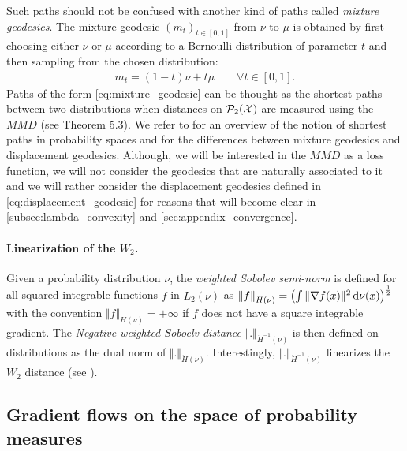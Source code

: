 \begin{remark}
	Such paths should not be confused with another kind of paths called \textit{mixture geodesics}. The mixture geodesic $(m_t)_{t\in[0,1]}$ from $\nu$ to $\mu$ is obtained by first choosing either $\nu$ or $\mu$ according to a Bernoulli distribution of parameter $t$ and then sampling from the chosen distribution:
	\begin{align}\label{eq:mixture_geodesic}
	m_t = (1-t)\nu + t\mu \qquad \forall t \in [0,1].
	\end{align}
	Paths of the form \cref{eq:mixture_geodesic} can be thought as the shortest paths between two distributions when distances on $\mathcal{P}_2({{\mathcal X}})$ are measured using the $MMD$ (see \cite{Bottou:2017} Theorem 5.3). We refer to \cite{Bottou:2017} for an overview of the notion of shortest paths in probability spaces and for the differences between mixture geodesics and displacement geodesics.
	Although, we will be interested in the $MMD$ as a loss function, we will not consider the geodesics that are naturally associated to it and we will rather consider the displacement geodesics defined in \cref{eq:displacement_geodesic} for reasons that will become clear in \cref{subsec:lambda_convexity} and \cref{sec:appendix_convergence}.
\end{remark}


\paragraph{Linearization of the $W_2$.} Given a probability distribution $\nu$, the \textit{weighted Sobolev semi-norm} is defined for all squared integrable functions $f$ in $L_2(\nu)$ as $ \Vert f \Vert_{\dot{H}(\nu)} = \left(\int \Vert \nabla f(x) \Vert^2 \mathop{}\!\mathrm{d} \nu(x) \right)^{\frac{1}{2}}$ with the convention $\Vert f \Vert_{\dot{H}(\nu)} = +\infty$ if $f$ does not have a square integrable gradient. The \textit{Negative weighted Soboelv distance} $ \Vert . \Vert_{\dot{H}^{-1}(\nu)} $ is then defined on distributions as the dual norm of $ \Vert .\Vert_{\dot{H}(\nu)} $. Interestingly, $\Vert . \Vert_{\dot{H}^{-1}(\nu)}$ linearizes the $W_2$ distance (see \cite[Theorem 7.26]{Villani:2003}).


\subsection{Gradient flows on the space of probability measures}\label{subsec:gradient_flows_functionals}


